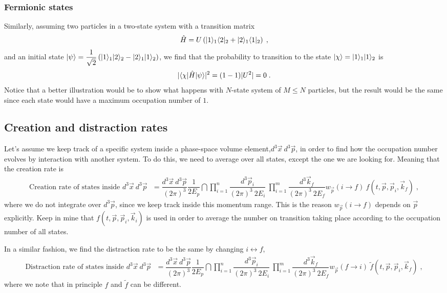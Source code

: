 \documentclass[11pt,a4paper]{article}
\begin{document}
\subsubsection*{Fermionic states}
%
Similarly, assuming two particles in a two-state system with a transition matrix 
%
$$
\hat H = U \left(  | 1 \rangle_1 \langle 2 |_2 + | 2 \rangle_1 \langle 1 |_2 \right)\;,
$$
% 
and an initial state $ | \psi \rangle = \dfrac{1}{\sqrt{2}} \left(   | 1 \rangle_1 | 2 \rangle_2 - | 2 \rangle_1 | 1 \rangle_2   \right)  $, we find that
the probability to transition to the state $| \chi \rangle = | 1 \rangle_1| 1 \rangle_2 $ is
%
\begin{align*}
	|\langle \chi | \hat{H}  | \psi \rangle |^2 = (1-1) |U^2| = 0\;.
\end{align*}
%
Notice that a better illustration would be to show what happens with $N$-state system of $M \leq N$ particles, but the result would be the same since
each state would have a maximum occupation number of $1$.



\subsection*{Creation and distraction rates}
%
Let's assume we keep track of a specific system inside a phase-space volume element,$d^3 \vec{x} \ d^3 \vec{p}$, in order to find how the occupation
number evolves by interaction with another system.  To do this, we need to average over all states, except the one we are looking for. Meaning that the 
creation rate is
%
\begin{align}
	\text{Creation rate of states inside $d^3 \vec{x} \ d^3 \vec{p}$ } =  
	 \dfrac{d^3 \vec{x} \ d^3 \vec{p}}{(2\pi)^3} \dfrac{1}{2E_p} 
	\dint  \prod_{i=1}^{n} \dfrac{d^3 \vec{p}_i}{(2\pi)^3 \ 2E_{i}} \ \prod_{i=1}^{m} \dfrac{d^3\vec{k}_f}{(2\pi)^3 \ 2E_{f}}  w_{\vec{p}}(i\to f) 
	\ f(t,\vec{p}, \vec{p}_i , \vec{k}_f)   \; ,
	\label{eq:creation_rate}
\end{align}
%
where we do not integrate over $d^3 \vec{p}$, since we keep track inside this momentum range. This is the reason $w_{\vec{p}}( i\to f)$ depends on $\vec{p}$
explicitly.  Keep in mine that $f(t,\vec{p}, \vec{p}_i , \vec{k}_i)$ is used in order to average the number on transition taking place according to the 
occupation number of all states.

In a similar fashion, we find the distraction rate to be the same by changing  $i \leftrightarrow f$, \ie 
%
\begin{align}
	\text{Distraction rate of states inside $d^3 \vec{x} \ d^3 \vec{p}$ } =  
	\dfrac{d^3 \vec{x} \ d^3 \vec{p}}{(2\pi)^3} \dfrac{1}{2E_p} 
	\dint  \prod_{i=1}^{n} \dfrac{d^3 \vec{p}_i}{(2\pi)^3 \ 2E_{i}} \ \prod_{i=1}^{m} \dfrac{d^3\vec{k}_f}{(2\pi)^3 \ 2E_{f}}  w_{\vec{p}}(f \to i) 
	\ \tilde{f}(t,\vec{p}, \vec{p}_i , \vec{k}_f)   \; ,
	\label{eq:distraction_rate}
\end{align}
%
where we note that in principle $f$ and $\tilde{f}$ can be different. 
\end{document}
